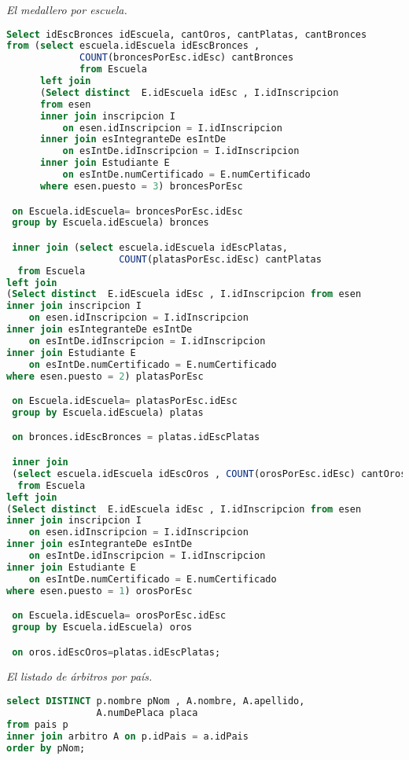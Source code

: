 \emph{El medallero por escuela.}
\begin{lstlisting}[language=SQL]
Select idEscBronces idEscuela, cantOros, cantPlatas, cantBronces
from (select escuela.idEscuela idEscBronces ,
             COUNT(broncesPorEsc.idEsc) cantBronces
             from Escuela
      left join
      (Select distinct  E.idEscuela idEsc , I.idInscripcion
      from esen
      inner join inscripcion I
          on esen.idInscripcion = I.idInscripcion
      inner join esIntegranteDe esIntDe
          on esIntDe.idInscripcion = I.idInscripcion
      inner join Estudiante E
          on esIntDe.numCertificado = E.numCertificado
      where esen.puesto = 3) broncesPorEsc

 on Escuela.idEscuela= broncesPorEsc.idEsc
 group by Escuela.idEscuela) bronces

 inner join (select escuela.idEscuela idEscPlatas,
                    COUNT(platasPorEsc.idEsc) cantPlatas
  from Escuela
left join
(Select distinct  E.idEscuela idEsc , I.idInscripcion from esen
inner join inscripcion I
    on esen.idInscripcion = I.idInscripcion
inner join esIntegranteDe esIntDe
    on esIntDe.idInscripcion = I.idInscripcion
inner join Estudiante E
    on esIntDe.numCertificado = E.numCertificado
where esen.puesto = 2) platasPorEsc

 on Escuela.idEscuela= platasPorEsc.idEsc
 group by Escuela.idEscuela) platas

 on bronces.idEscBronces = platas.idEscPlatas

 inner join
 (select escuela.idEscuela idEscOros , COUNT(orosPorEsc.idEsc) cantOros
  from Escuela
left join
(Select distinct  E.idEscuela idEsc , I.idInscripcion from esen
inner join inscripcion I
    on esen.idInscripcion = I.idInscripcion
inner join esIntegranteDe esIntDe
    on esIntDe.idInscripcion = I.idInscripcion
inner join Estudiante E
    on esIntDe.numCertificado = E.numCertificado
where esen.puesto = 1) orosPorEsc

 on Escuela.idEscuela= orosPorEsc.idEsc
 group by Escuela.idEscuela) oros

 on oros.idEscOros=platas.idEscPlatas;
\end{lstlisting}


\emph{El listado de árbitros por país.}
\begin{lstlisting}[language=SQL]
select DISTINCT p.nombre pNom , A.nombre, A.apellido,
                A.numDePlaca placa
from pais p
inner join arbitro A on p.idPais = a.idPais
order by pNom;
\end{lstlisting}


